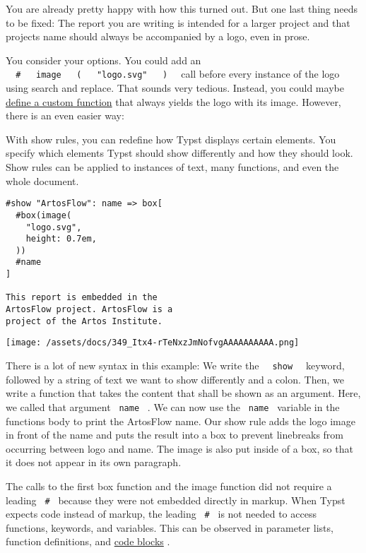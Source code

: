 You are already pretty happy with how this turned out. But one last
thing needs to be fixed: The report you are writing is intended for a
larger project and that project\textquotesingle s name should always be
accompanied by a logo, even in prose.

You consider your options. You could add an
\texttt{\ }{\texttt{\ \#\ }}\texttt{\ }{\texttt{\ image\ }}\texttt{\ }{\texttt{\ (\ }}\texttt{\ }{\texttt{\ "logo.svg"\ }}\texttt{\ }{\texttt{\ )\ }}\texttt{\ }
call before every instance of the logo using search and replace. That
sounds very tedious. Instead, you could maybe
\href{/docs/reference/foundations/function/\#defining-functions}{define
a custom function} that always yields the logo with its image. However,
there is an even easier way:

With show rules, you can redefine how Typst displays certain elements.
You specify which elements Typst should show differently and how they
should look. Show rules can be applied to instances of text, many
functions, and even the whole document.

\begin{verbatim}
#show "ArtosFlow": name => box[
  #box(image(
    "logo.svg",
    height: 0.7em,
  ))
  #name
]

This report is embedded in the
ArtosFlow project. ArtosFlow is a
project of the Artos Institute.
\end{verbatim}

\texttt{[image: /assets/docs/349\_Itx4-rTeNxzJmNofvgAAAAAAAAAA.png]}

There is a lot of new syntax in this example: We write the
\texttt{\ }{\texttt{\ show\ }}\texttt{\ } keyword, followed by a string
of text we want to show differently and a colon. Then, we write a
function that takes the content that shall be shown as an argument.
Here, we called that argument \texttt{\ name\ } . We can now use the
\texttt{\ name\ } variable in the function\textquotesingle s body to
print the ArtosFlow name. Our show rule adds the logo image in front of
the name and puts the result into a box to prevent linebreaks from
occurring between logo and name. The image is also put inside of a box,
so that it does not appear in its own paragraph.

The calls to the first box function and the image function did not
require a leading \texttt{\ \#\ } because they were not embedded
directly in markup. When Typst expects code instead of markup, the
leading \texttt{\ \#\ } is not needed to access functions, keywords, and
variables. This can be observed in parameter lists, function
definitions, and \href{/docs/reference/scripting/}{code blocks} .

